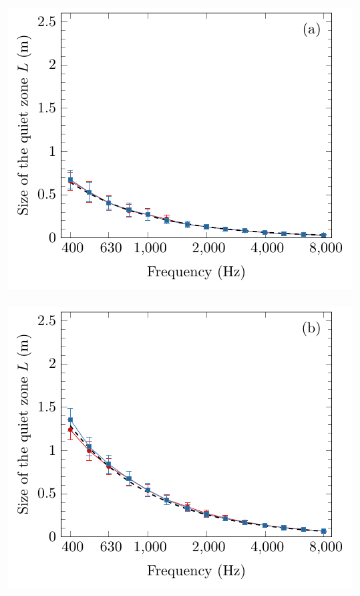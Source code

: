 \begin{figure}[!htb]
    \centering
    \begin{subfigure}{0.32\textwidth}
        \centering
        \includegraphics[width = \textwidth]{fig/200404A_size_v2}
    \end{subfigure}
    \begin{subfigure}{0.32\textwidth}
        \centering
        \includegraphics[width = \textwidth]{fig/200331A_size_v2}
    \end{subfigure}
    \begin{subfigure}{0.32\textwidth}

\end{subfigure}
\end{figure}
